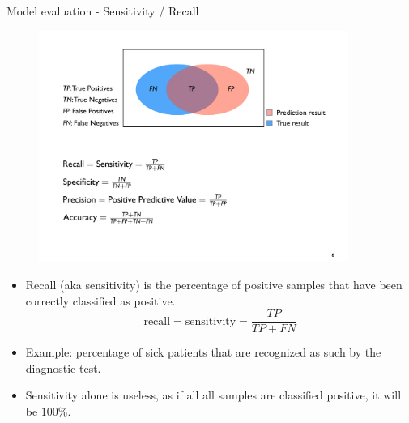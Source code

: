 \documentclass[xcolor=pdftex,dvipsnames,table]{beamer}
\begin{document}
\begin{frame}{Model evaluation - Sensitivity / Recall}
	\begin{figure}[htb]
		\includegraphics[width=0.9\textwidth]{../graphics/ModelEvaluation.pdf}
	\end{figure}
	\begin{itemize}	
		\item Recall (aka sensitivity) is the percentage of positive samples that have been correctly classified as positive. 
		\begin{equation}
			\text{recall} = \text{sensitivity} = \frac{TP}{TP + FN}
		\end{equation}
		\item Example: percentage of sick patients that are recognized as such by the diagnostic test. 
		\item Sensitivity alone is useless, as if all all samples are classified positive, it will be $100\%$. 
	\end{itemize}
\end{frame}
\end{document}
